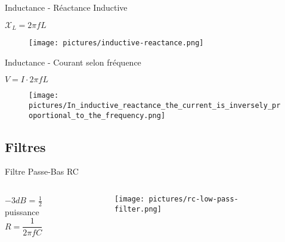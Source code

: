 \begin{frame}{Inductance - Réactance Inductive}
    \begin{center}
        \Large{
            $\mathcal{X}_L = 2 \pi f L$
        }
        \vspace{15pt}
        \begin{figure}
            \centering
            \texttt{[image: pictures/inductive-reactance.png]}
        \end{figure}
    \end{center}
\end{frame}

\begin{frame}{Inductance - Courant selon fréquence}
    \begin{center}
        \Large{
            $V = I \cdot 2 \pi f L$
        }
        \vspace{15pt}
        \begin{figure}
            \centering
            \texttt{[image: pictures/In\_inductive\_reactance\_the\_current\_is\_inversely\_proportional\_to\_the\_frequency.png]}
        \end{figure}
    \end{center}
\end{frame}


\subsection{Filtres}
\begin{frame}{Filtre Passe-Bas RC}
    \begin{columns}
        \begin{column}{0.33\textwidth}
            \begin{center}
                $-3dB$ = $\frac{1}{2}$ puissance\\
                \vspace{10pt}
                \Large{$R = \dfrac{1}{2 \pi f C}$}
            \end{center}
        \end{column}
        
        \begin{column}{0.66\textwidth}
            \begin{figure}
                \centering
                \texttt{[image: pictures/rc-low-pass-filter.png]}
            \end{figure}
        \end{column}
    \end{columns}
\end{frame}

